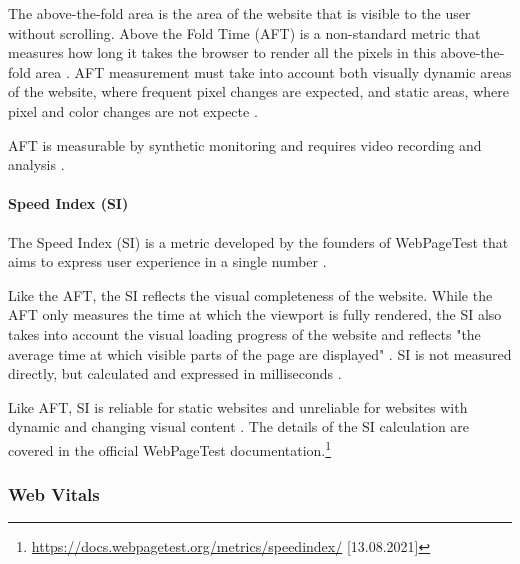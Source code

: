 The above-the-fold area is the area of the website that is visible to the user without scrolling.
Above the Fold Time (AFT) is a non-standard metric that measures how long it takes the browser to render all the pixels in this above-the-fold area \cite{2019Enghardt}.
AFT measurement must take into account both visually dynamic areas of the website, where frequent pixel changes are expected, and static areas, where pixel and color changes are not expecte \cite{2018Netravali}.

AFT is measurable by synthetic monitoring and requires video recording and analysis \cite{2013Meenan}.


\paragraph{Speed Index (SI)} %

The Speed Index (SI) is a metric developed by the founders of WebPageTest that aims to express user experience in a single number \cite{2013Meenan}.

Like the AFT, the SI reflects the visual completeness of the website.
While the AFT only measures the time at which the viewport is fully rendered, the SI also takes into account the visual loading progress of the website and reflects "the average time at which visible parts of the page are displayed" \cite{2018Netravali}.
SI is not measured directly, but calculated and expressed in milliseconds \cite{2021GTmetrix}.

Like AFT, SI is reliable for static websites and unreliable for websites with dynamic and changing visual content \cite{2021Wingerath}.
The details of the SI calculation are covered in the official WebPageTest documentation.\footnote{\url{https://docs.webpagetest.org/metrics/speedindex/} [13.08.2021]}



\subsubsection{Web Vitals} %
\label{subsubsection:web_vitals}


